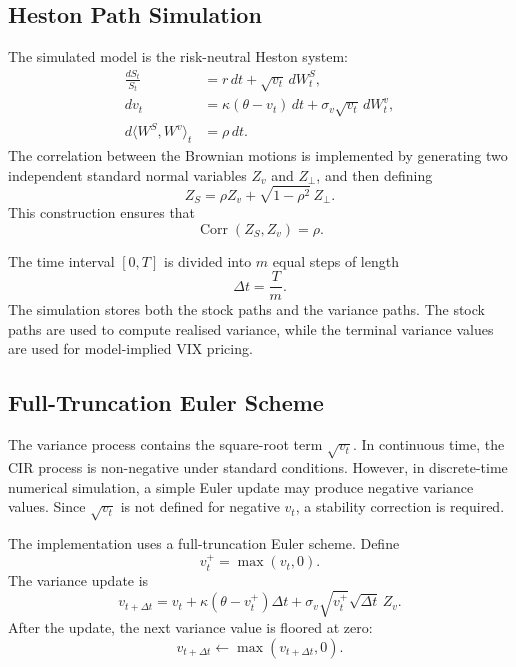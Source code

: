 \subsection{Heston Path Simulation}

The simulated model is the risk-neutral Heston system:
\begin{align}
\frac{dS_t}{S_t}
&=
r\,dt+\sqrt{v_t}\,dW_t^S,\\
dv_t
&=
\kappa(\theta-v_t)\,dt+\sigma_v\sqrt{v_t}\,dW_t^v,\\
d\langle W^S,W^v\rangle_t
&=
\rho\,dt.
\end{align}
The correlation between the Brownian motions is implemented by generating two independent standard normal variables \(Z_v\) and \(Z_\perp\), and then defining
\begin{equation}
Z_S
=
\rho Z_v+\sqrt{1-\rho^2}\,Z_\perp.
\end{equation}
This construction ensures that
\begin{equation}
\operatorname{Corr}(Z_S,Z_v)=\rho.
\end{equation}

The time interval \([0,T]\) is divided into \(m\) equal steps of length
\begin{equation}
\Delta t=\frac{T}{m}.
\end{equation}
The simulation stores both the stock paths and the variance paths. The stock paths are used to compute realised variance, while the terminal variance values are used for model-implied VIX pricing.

\subsection{Full-Truncation Euler Scheme}

The variance process contains the square-root term \(\sqrt{v_t}\). In continuous time, the CIR process is non-negative under standard conditions. However, in discrete-time numerical simulation, a simple Euler update may produce negative variance values. Since \(\sqrt{v_t}\) is not defined for negative \(v_t\), a stability correction is required.

The implementation uses a full-truncation Euler scheme. Define
\begin{equation}
v_t^+
=
\max(v_t,0).
\end{equation}
The variance update is
\begin{equation}
v_{t+\Delta t}
=
v_t
+
\kappa(\theta-v_t^+)\Delta t
+
\sigma_v\sqrt{v_t^+}\sqrt{\Delta t}\,Z_v.
\label{eq:mc_variance_update}
\end{equation}
After the update, the next variance value is floored at zero:
\begin{equation}
v_{t+\Delta t}
\leftarrow
\max(v_{t+\Delta t},0).
\end{equation}

